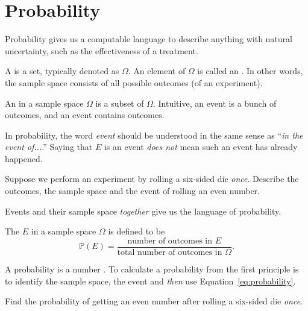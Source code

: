 \documentclass[../main.tex]{subfiles}
\begin{document}
 \section{Probability}

Probability gives us a computable language to describe anything with natural uncertainty, such as the effectiveness of a treatment.

\begin{definition}
  A  is a set, typically denoted as \(\Omega\).  An element of \(\Omega\) is called an .   In other words, the sample space consists of all possible outcomes (of an experiment).

  An  in a sample space \(\Omega\) is a subset of \(\Omega\).  Intuitive, an event is a bunch of outcomes, and an event contains outcomes.
\end{definition}
In probability, the word \emph{event} should be understood in the same sense as ``\emph{in the event of...}.'' Saying that \(E\) is an event \emph{does not} mean such an event has already happened.


\begin{example} \label{ex:probability-die-1}
  Suppose we perform an experiment by rolling a six-sided die \emph{once}.  Describe the outcomes, the sample space and the event of rolling an even number. 

\end{example}

Events and their sample space \emph{together} give us the language of probability.
\begin{definition}[probability]
  The  \(E\) in a sample space \(\Omega\) is defined to be
  \begin{equation} \label{eq:probability}
    \mathbb{P}(E) = \frac{\text{number of outcomes in \(E\)}}{\text{total number of outcomes in \(\Omega\)}}.
  \end{equation}
\end{definition}
A probability is a number \underline{\hspace{3in}}. To calculate a probability from the first principle is to identify the sample space, the event and \emph{then} use Equation~\eqref{eq:probability}.
\begin{example}
  Find the probability of getting an even number after rolling a six-sided die \emph{once}.
\end{example}
\clearpage
\end{document}
